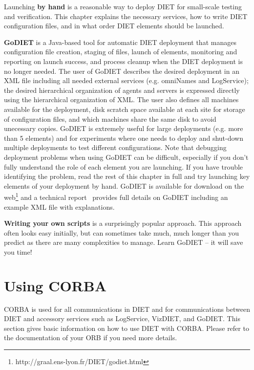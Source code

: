 Launching \textbf{by hand} is a reasonable way to deploy DIET for
small-scale testing and verification. This chapter explains the 
necessary services, how to write DIET configuration files, and in
what order DIET elements should be launched.

\textbf{GoDIET} is a Java-based tool for automatic DIET deployment
that manages configuration file creation, staging of files, launch
of elements, monitoring and reporting on launch success, and process
cleanup when the DIET deployment is no longer needed. The user of
GoDIET describes the desired deployment in an XML file including all
needed external services (e.g. omniNames and LogService); the
desired hierarchical organization of agents and servers is expressed
directly using the hierarchical organization of XML.  The user also
defines all machines available for the deployment, disk scratch
space available at each site for storage of configuration files, and
which machines share the same disk to avoid unecessary copies.
GoDIET is extremely useful for large deployments (e.g. more than 5
elements) and for experiments where one needs to deploy and
shut-down multiple deployments to test different configurations.
Note that debugging deployment problems when using GoDIET can be
difficult, especially if you don't fully understand the role of each
element you are launching.  If you have trouble identifying the
problem, read the rest of this chapter in full and try launching key
elements of your deployment by hand.  GoDIET is available for
download on the web\footnote{http://graal.ens-lyon.fr/DIET/godiet.html}
and a technical report~\cite{CDa05} provides full details on GoDIET
including an example XML file with explanations.

\textbf{Writing your own scripts} is a surprisingly popular
approach.  This approach often looks easy initially, but can
sometimes take much, much longer than you predict as there are many
complexities to manage.  Learn GoDIET -- it will save you time!

\section{Using CORBA} 
\label{sec:CORBA_services}

CORBA is used for all communications in DIET and for communications
between DIET and accessory services such as LogService, VizDIET, and
GoDIET.  This section gives basic information on how to use DIET
with CORBA.  Please refer to the documentation of your ORB if you
need more details.

